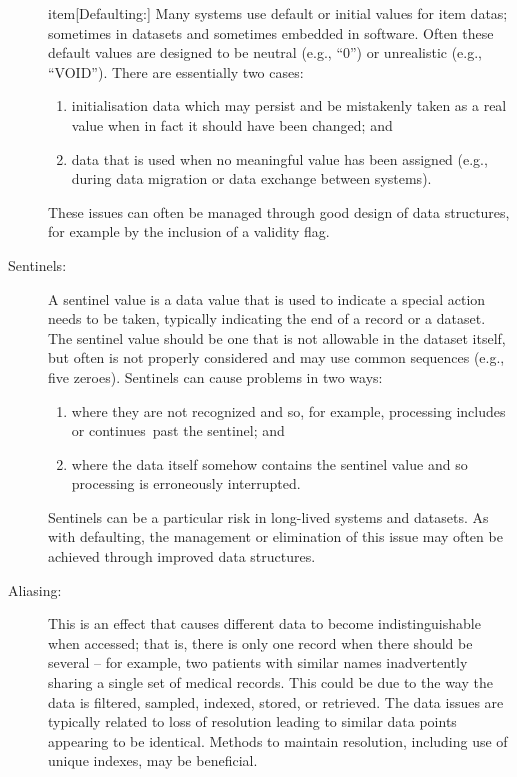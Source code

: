 \begin{description}
item[Defaulting:] Many systems use default or initial values for \glspl{item data}; sometimes in \glspl{dataset} and sometimes embedded in software. Often these default values are designed to be neutral (e.g., ``0'') or unrealistic (e.g., ``VOID''). There are essentially two cases:
\begin{enumerate}
	\item initialisation data which may persist and be mistakenly taken as a real value when in fact it should have been changed; and
	\item data that is used when no meaningful value has been assigned (e.g., during data migration or data exchange between systems).
\end{enumerate}	
These issues can often be managed through good design of data structures, for example by the inclusion of a validity flag.

\item[Sentinels:] A sentinel value is a data value that is used to indicate a special action needs to be taken, typically indicating the end of a record or a \gls{dataset}. The sentinel value should be one that is not allowable in the \gls{dataset} itself, but often is not properly considered and may use common sequences (e.g., five zeroes). Sentinels can cause problems in two ways:
\begin{enumerate}
	\item where they are not recognized and so, for example, processing \cbstart includes or continues\cbend\ past the sentinel; and
	\item where the data itself somehow contains the sentinel value and so processing is erroneously interrupted.
\end{enumerate}
Sentinels can be a particular risk in long-lived systems and \glspl{dataset}. As with \cbstart defaulting\cbend, the management or elimination of this issue may often be achieved through improved data structures.

\item[Aliasing:] This is an effect that causes different data to become indistinguishable when accessed; that is, there is only one record when there should be several -- for example, two patients with similar names inadvertently sharing a single set of medical records. This could be due to the way the data is filtered, sampled, indexed, stored, or retrieved. The data issues are typically related to loss of resolution leading to similar data points appearing to be identical. \cbstart Methods to maintain resolution, including use of unique indexes, may be beneficial.\cbend\


\end{description}
